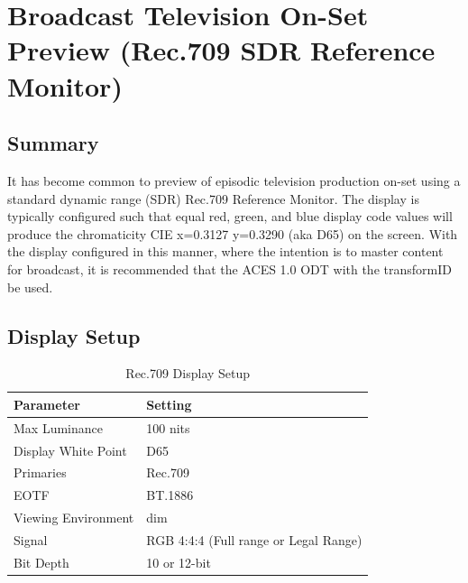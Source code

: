 \clearpage
\section{Broadcast Television On-Set Preview (Rec.709 SDR Reference Monitor)}
\label{sec:ot-app-rec709onset}

\subsection{Summary}
\label{subsec:summary-rec709onset}

It has become common to preview of episodic television production on-set using a standard dynamic range (SDR) Rec.709  Reference Monitor. The display is typically configured such that equal red, green, and blue display code values will produce the chromaticity CIE x=0.3127 y=0.3290 (aka D65) on the screen. With the display configured in this manner, where the intention is to master content for broadcast, it is recommended that the ACES 1.0 ODT with the transformID \texttt{} be used.

\subsection{Display Setup}
\label{subsec:setup-rec709onset}

\begin{table}[ht!]
    \centering
        \begin{tabular}{|p{1.25in}|p{3in}|}
            \hline
            \textbf{Parameter} & \textbf{Setting} \\ \hline
            Max Luminance & 100 nits \\ \hline
            Display White Point & D65 \\ \hline
            Primaries & Rec.709  \\ \hline
            EOTF & BT.1886 \\ \hline
            Viewing Environment & dim \\ \hline
            Signal & RGB 4:4:4 (Full range or Legal Range) \\ \hline
            Bit Depth & 10 or 12-bit \\ \hline 
    \end{tabular}
    \caption[ Rec.709 Display Setup ]{\small Rec.709 Display Setup} 
    \label{tab:setup-rec709onset}
\end{table}

